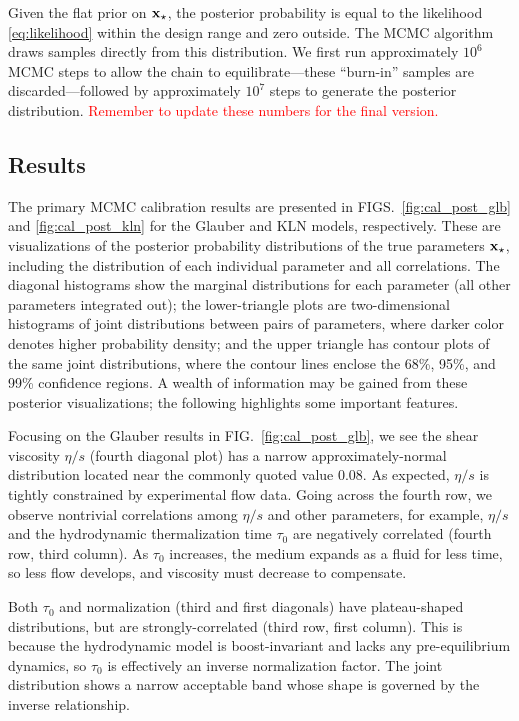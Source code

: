 \documentclass[aps,prc,reprint,superscriptaddress,amsmath]{revtex4-1}
\newcommand{\todo}[1]{\textcolor{red}{#1}}
\begin{document}
Given the flat prior on $\mathbf x_\star$, the posterior probability is equal to the likelihood \eqref{eq:likelihood} within the design range and zero outside.
The MCMC algorithm draws samples directly from this distribution.
We first run approximately $10^6$ MCMC steps to allow the chain to equilibrate---these ``burn-in'' samples are discarded---followed by approximately $10^7$ steps to generate the posterior distribution.
\todo{Remember to update these numbers for the final version.}

\subsection{Results}

The primary MCMC calibration results are presented in FIGS.~\ref{fig:cal_post_glb} and \ref{fig:cal_post_kln} for the Glauber and KLN models, respectively.
These are visualizations of the posterior probability distributions of the true parameters $\mathbf x_\star$, including the distribution of each individual parameter and all correlations.
The diagonal histograms show the marginal distributions for each parameter (all other parameters integrated out);
the lower-triangle plots are two-dimensional histograms of joint distributions between pairs of parameters, where darker color denotes higher probability density;
and the upper triangle has contour plots of the same joint distributions, where the contour lines enclose the 68\%, 95\%, and 99\% confidence regions.
A wealth of information may be gained from these posterior visualizations; the following highlights some important features.

Focusing on the Glauber results in FIG.~\ref{fig:cal_post_glb}, we see the shear viscosity $\eta/s$ (fourth diagonal plot) has a narrow approximately-normal distribution located near the commonly quoted value 0.08.
As expected, $\eta/s$ is tightly constrained by experimental flow data.
Going across the fourth row, we observe nontrivial correlations among $\eta/s$ and other parameters, for example, $\eta/s$ and the hydrodynamic thermalization time $\tau_0$ are negatively correlated (fourth row, third column).
As $\tau_0$ increases, the medium expands as a fluid for less time, so less flow develops, and viscosity must decrease to compensate.

Both $\tau_0$ and normalization (third and first diagonals) have plateau-shaped distributions, but are strongly-correlated (third row, first column).
This is because the hydrodynamic model is boost-invariant and lacks any pre-equilibrium dynamics, so $\tau_0$ is effectively an inverse normalization factor.
The joint distribution shows a narrow acceptable band whose shape is governed by the inverse relationship.
\end{document}
